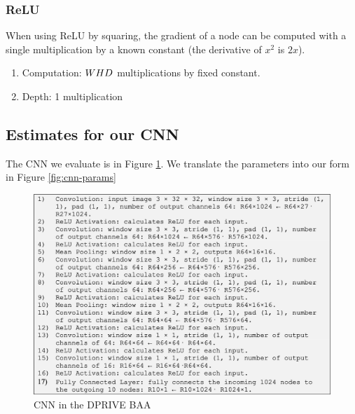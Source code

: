 \subsubsection{ReLU}
When using ReLU by squaring, the gradient of a node can be computed with a single multiplication by a known constant (the derivative of $x^{2}$ is $2x$).

\begin{enumerate}
	\item Computation: $WHD$ multiplications by fixed constant.
	\item Depth: 1 multiplication
\end{enumerate}

\subsection{Estimates for our CNN}

The CNN we evaluate is in Figure \ref{fig:cnn-baa}. We translate the parameters into our form in Figure \ref{fig:cnn-params}


\begin{figure}[h!]
\includegraphics[width=\textwidth]{figs/cnn}
\caption{CNN in the DPRIVE BAA}
\label{fig:cnn-baa}
\end{figure}


